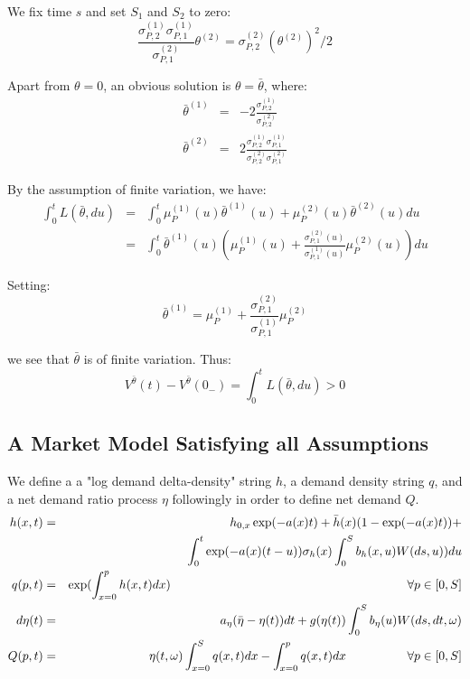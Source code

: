 \documentclass{article}
\begin{document}
We fix time $s$ and set $S_{1}$ and $S_{2}$ to zero:%
\begin{equation*}
\frac{\sigma _{P,2}^{(1)}\sigma _{P,1}^{(1)}}{\sigma _{P,1}^{(2)}}\theta
^{(2)}=\sigma _{P,2}^{(2)}(\theta ^{(2)})^{2}/2
\end{equation*}

Apart from $\theta =0$, an obvious solution is $\theta =\bar{\theta}$, where:%
\begin{eqnarray*}
\bar{\theta}^{(1)} &=&-2\frac{\sigma _{P,2}^{(1)}}{\sigma _{P,2}^{(2)}} \\
\bar{\theta}^{(2)} &=&2\frac{\sigma _{P,2}^{(1)}\sigma _{P,1}^{(1)}}{\sigma
_{P,2}^{(2)}\sigma _{P,1}^{(2)}}
\end{eqnarray*}

By the assumption of finite variation, we have:%
\begin{eqnarray*}
\int_{0}^{t}L(\bar{\theta},du) &=&\int_{0}^{t}\mu _{P}^{(1)}(u)\bar{\theta}%
^{(1)}(u)+\mu _{P}^{(2)}(u)\bar{\theta}^{(2)}(u)du \\
&=&\int_{0}^{t}\bar{\theta}^{(1)}(u)(\mu _{P}^{(1)}(u)+\frac{\sigma
_{P,1}^{(2)}(u)}{\sigma _{P,1}^{(1)}(u)}\mu _{P}^{(2)}(u))du
\end{eqnarray*}

Setting:%
\begin{equation*}
\bar{\theta}^{(1)}=\mu _{P}^{(1)}+\frac{\sigma _{P,1}^{(2)}}{\sigma
_{P,1}^{(1)}}\mu _{P}^{(2)}
\end{equation*}

we see that $\bar{\theta}$ is of finite variation. Thus:%
\begin{equation*}
V^{\bar{\theta}}(t)-V^{\bar{\theta}}(0_{-})=\int_{0}^{t}L(\bar{\theta},du)>0
\end{equation*}

\subsection{A Market Model Satisfying all Assumptions}

We define a a "log demand delta-density" string $h$, a demand density string
$q$, and a net demand ratio process $\eta $ followingly in order to define
net demand $Q$.%
\begin{eqnarray}
h(x,t) &=&h_{0,x}\exp (-a(x)t)+\bar{h}(x)(1-\exp (-a(x)t))+  \label{equ_h_A}
\\
&&\int_{0}^{t}\exp (-a(x)(t-u))\sigma _{h}(x)\int_{0}^{S}b_{h}(x,u)W(ds,u))du
\notag \\
q(p,t) &=&\exp ({\int_{x=0}^{p}h(x,t)dx)}\text{ \ \ \ \ \ \ \ \ \ \ \ \ \ \
\ \ \ \ \ \ \ \ \ \ \ \ \ \ \ \ \ \ \ \ \ \ \ \ \ \ \ \ \ \ \ \ \ \ \ \ \ \
\ \ \ }\forall p\in \lbrack 0,S]  \label{equ_q_A} \\
d\eta (t) &=&a_{\eta }(\bar{\eta}-\eta (t))dt+g(\eta (t))\int_{0}^{S}b_{\eta
}(u)W(ds,dt,\omega )  \label{equ_eta_A_bis} \\
Q(p,t) &=&\eta (t,\omega )\int_{x=0}^{S}q(x,t)dx-\int_{x=0}^{p}q(x,t)dx\text{
\ \ \ \ \ \ \ \ \ \ \ \ }\forall p\in \lbrack 0,S]  \label{equ_Q_A}
\end{eqnarray}
\end{document}
